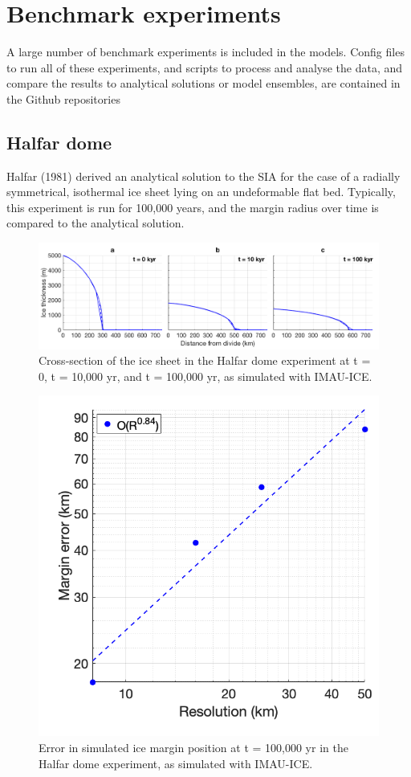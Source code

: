 \documentclass{article}
\begin{document}
\newpage
\section{Benchmark experiments}

A large number of benchmark experiments is included in the models. Config files to run all of these experiments, and scripts to process and analyse the data, and compare the results to analytical solutions or model ensembles, are contained in the Github repositories

\subsection{Halfar dome}

Halfar (1981) derived an analytical solution to the SIA for the case of a radially symmetrical, isothermal ice sheet lying on an undeformable flat bed. Typically, this experiment is run for 100,000 years, and the margin radius over time is compared to the analytical solution.

\begin{figure}[H]
  \includegraphics[width=0.95\linewidth]{Fig_benchmark_Halfar1.png}
  \caption{Cross-section of the ice sheet in the Halfar dome experiment at t = 0, t = 10,000 yr, and t = 100,000 yr, as simulated with IMAU-ICE.}
\end{figure}

\begin{figure}[H]
  \includegraphics[width=0.4\linewidth]{Fig_benchmark_Halfar2.png}
  \caption{Error in simulated ice margin position at t = 100,000 yr in the Halfar dome experiment, as simulated with IMAU-ICE.}
\end{figure}
\end{document}
